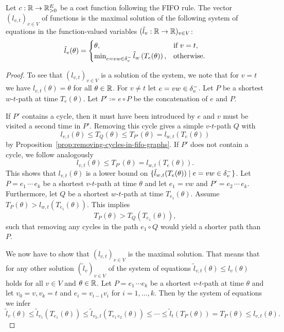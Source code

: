 \begin{proposition}\label{prop:characterization-arrival-functions}
    Let $c:\mathbb{R}\rightarrow\mathbb{R}_{>0}^E$ be a cost function following the FIFO rule.
    The vector $(l_{v,t})_{v\in V}$ of functions is the maximal solution of the following system of equations in the function-valued variables $(\tilde l_v: \mathbb{R} \rightarrow \mathbb{R})_{v\in V}$:
    \[
        \tilde l_v(\theta) = \begin{cases}
            \theta, &\text{if $v = t$}, \\
            \min_{\substack{
                e=vw\in\delta^-_{v}               
            }} \tilde{l}_w\left(
                T_e(\theta)
            \right), &\text{otherwise}.
        \end{cases}
    \]
\end{proposition}
\begin{proof}
    To see that $(l_{v,t})_{v\in V}$ is a solution of the system, we note that for $v = t$ we have $l_{v,t}(\theta) = \theta$ for all $\theta\in\mathbb{R}$.
    For $v\neq t$ let $e=vw\in\delta^-_{v}$.
    Let $P$ be a shortest $w$-$t$-path at time $T_{e}(\theta)$.
    Let $P'\coloneqq e\circ P$ be the concatenation of $e$ and $P$.

    If $P'$ contains a cycle, then it must have been introduced by $e$ and $v$ must be visited a second time in $P'$.
    Removing this cycle gives a simple $v$-$t$-path $Q$ with 
    \[
        l_{v,t}(\theta) \leq T_{Q}(\theta)\leq T_{P'}(\theta) = l_{w,t}(T_{e}(\theta))
    \]
    by Proposition~\ref{prop:removing-cycles-in-fifo-graphs}.
    If $P'$ does not contain a cycle, we follow analogously
    \[
        l_{v,t}(\theta) \leq T_{P'}(\theta) = l_{w,t}(T_{e}(\theta)).
    \]
    This shows that $l_{v,t}(\theta)$ is a lower bound on $\{ \tilde l_{w,t}(
        T_{e}(\theta)
    ) \mid e=vw\in\delta^-_{v}  \}$.
    Let $P = e_1\, \cdots\, e_k$ be a shortest $v$-$t$-path at time $\theta$ and let $e_1=vw$ and $P' = e_2\,\cdots\,e_k$.
    Furthermore, let $Q$ be a shortest $w$-$t$-path at time $T_{e_1}(\theta)$.
    Assume $T_{P}(\theta) > l_{w,t}(T_{e_1}(\theta))$.
    This implies
    \[
        T_{P}(\theta) > 
        T_{Q}(T_{e_1}(\theta)),
    \]
    such that removing any cycles in the path $e_1\circ Q$ would yield a shorter path than $P$.

    We now have to show that $(l_{v,t})_{v\in V}$ is the maximal solution.
    That means that for any other solution $(\tilde l_v)_{v\in V}$ of the system of equations
     $\tilde l_{v,t}(\theta) \leq l_v(\theta)$ holds for all $v\in V$ and $\theta\in\mathbb{R}$.
    Let $P = e_1 \,\cdots e_k$ be a shortest $v$-$t$-path at time $\theta$ and let $v_0 = v, v_k= t$ and $e_i = v_{i-1} v_i$ for $i=1,\dots,k$.
    Then by the system of equations we infer \[
        \tilde l_{v}(\theta) \leq \tilde l_{v_1}(T_{e_1}(\theta)) \leq \tilde l_{v_2,t}(T_{e_1\,e_2} (\theta)) \leq \cdots \leq \tilde l_{t}(T_P(\theta)) = T_P(\theta) \leq l_{v,t}(\theta).
    \]
\end{proof}

